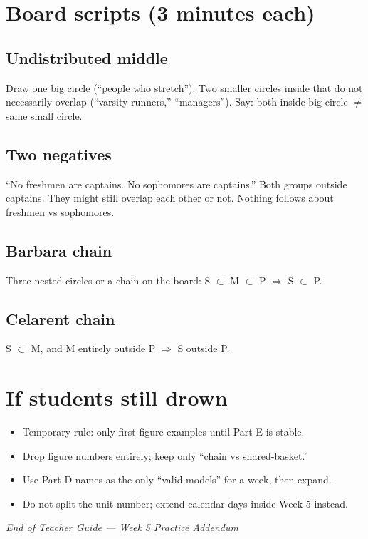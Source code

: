\documentclass[11pt]{article}
\begin{document}
\newpage
\section{Board scripts (3 minutes each)}

\subsection*{Undistributed middle}
Draw one big circle (``people who stretch''). Two smaller circles inside that do not necessarily overlap (``varsity runners,'' ``managers''). Say: both inside big circle $\neq$ same small circle.

\subsection*{Two negatives}
``No freshmen are captains. No sophomores are captains.'' Both groups outside captains. They might still overlap each other or not. Nothing follows about freshmen vs sophomores.

\subsection*{Barbara chain}
Three nested circles or a chain on the board: S $\subset$ M $\subset$ P $\Rightarrow$ S $\subset$ P.

\subsection*{Celarent chain}
S $\subset$ M, and M entirely outside P $\Rightarrow$ S outside P.

\section{If students still drown}
\begin{itemize}
\item Temporary rule: only first-figure examples until Part E is stable.
\item Drop figure numbers entirely; keep only ``chain vs shared-basket.''
\item Use Part D names as the only ``valid models'' for a week, then expand.
\item Do not split the unit number; extend calendar days inside Week 5 instead.
\end{itemize}

\vspace{0.6em}
\begin{center}
\textit{End of Teacher Guide --- Week 5 Practice Addendum}
\end{center}
\end{document}
